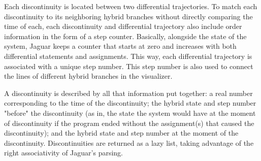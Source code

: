Each discontinuity is located between two differential trajectories. To match each discontinuity to its neighboring hybrid branches without directly comparing the time of each, each discontinuity and differential trajectory also include order information in the form of a step counter. Basically, alongside the state of the system, Jaguar keeps a counter that starts at zero and increases with both differential statements and assignments. This way, each differential trajectory is associated with a unique step number. This step number is also used to connect the lines of different hybrid branches in the visualizer.


A discontinuity is described by all that information put together: a real number corresponding to the time of the discontinuity; the hybrid state and step number "before" the discontinuity (as in, the state the system would have at the moment of discontinuity if the program ended without the assignment(s) that caused the discontinuity); and the hybrid state and step number at the moment of the discontinuity. Discontinuities are returned as a lazy list, taking advantage of the right associativity of Jaguar's parsing.
